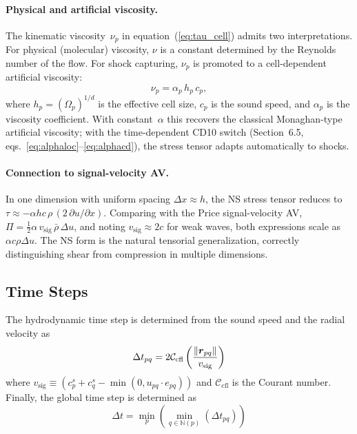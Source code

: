 \documentclass[twocolumn]{aastex63}
\newcommand{\vel}{{u}}
\begin{document}
\paragraph{Physical and artificial viscosity.}
The kinematic viscosity~$\nu_p$ in
equation~(\ref{eq:tau_cell}) admits two interpretations.
For physical (molecular) viscosity, $\nu$ is a constant
determined by the Reynolds number of the flow.
For shock capturing, $\nu_p$ is promoted to a
cell-dependent artificial viscosity:
\begin{equation}\label{eq:nu_av}
  \nu_p = \alpha_p\,h_p\,c_p,
\end{equation}
where $h_p = (\Omega_p)^{1/d}$ is the effective cell size,
$c_p$ is the sound speed, and $\alpha_p$ is the viscosity
coefficient.
With constant~$\alpha$ this recovers the classical
Monaghan-type artificial viscosity;
with the time-dependent CD10 switch
(Section~6.5, eqs.~\ref{eq:alphaloc}--\ref{eq:alphacd}),
the stress tensor adapts automatically to shocks.

\paragraph{Connection to signal-velocity AV.}
In one dimension with uniform spacing
$\Delta x \approx h$, the NS stress tensor reduces to
$\tau \approx -\alpha h c\,\rho\,(2\,\partial\vel/\partial x)$.
Comparing with the Price signal-velocity AV,
$\Pi = \tfrac{1}{2}\alpha\,v_\mathrm{sig}\,
  \bar\rho\,\Delta\vel$,
and noting $v_\mathrm{sig} \approx 2c$ for weak waves,
both expressions scale as $\alpha c\rho\Delta\vel$.
The NS form is the natural tensorial generalization,
correctly distinguishing shear from compression in
multiple dimensions.





\subsection{Time Steps}
The hydrodynamic time step is determined from the sound speed and the radial velocity as
\begin{equation}
	\Delta t_{pq} = 2 \mathcal{C}_\text{cfl} \left( {  \|\boldsymbol{r}_{pq}\| \over  v_\text{sig}}\right)
\end{equation}
where $v_\text{sig}\equiv \left(c^s_p+c^s_q - \min(0, \vel_{pq}\cdot e_{pq}) \right)$ and $\mathcal{C}_\text{cfl}$ is the Courant number. Finally, the global time step is determined as
\begin{equation}
	\Delta t = \min_p ( \min_{q\in\mathbb{N}(p)} (\Delta t_{pq}))
\end{equation}
\end{document}
